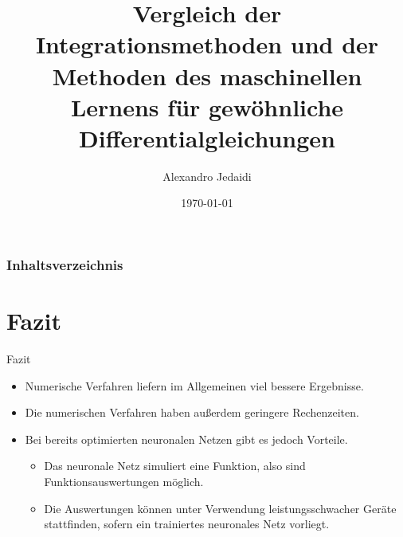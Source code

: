 \documentclass[handout, 10pt]{beamer}
\author{Alexandro Jedaidi}
\title{\textbf{Vergleich der Integrationsmethoden und der Methoden des maschinellen
Lernens für gewöhnliche Differentialgleichungen}}
\date{\today}
\begin{document}
    \begin{frame}
        \titlepage
    \end{frame}

    \begin{frame}
        \frametitle{Inhaltsverzeichnis}
        \tableofcontents
    \end{frame}

    

    


    


    

    \section{Fazit}

    \begin{frame}{Fazit}
        \begin{itemize}
            \item<1-> Numerische Verfahren liefern im Allgemeinen viel bessere Ergebnisse.
            \item<2-> Die numerischen Verfahren haben außerdem geringere Rechenzeiten.
            \item<3-> Bei bereits optimierten neuronalen Netzen gibt es jedoch Vorteile.
            \begin{itemize}
                \item<1-> Das neuronale Netz simuliert eine Funktion, also sind Funktionsauswertungen möglich.
                \item<2-> Die Auswertungen können unter Verwendung leistungsschwacher Geräte stattfinden, sofern ein
                trainiertes neuronales Netz vorliegt.
            \end{itemize}
        \end{itemize}
    \end{frame}
\end{document}
